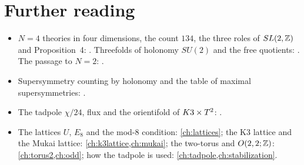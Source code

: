 \section*{Further reading}
\begin{itemize}[leftmargin=*]
 \item $N=4$ theories in four dimensions, the count $134$, the three roles of $SL(2,\mathbb{Z})$ and
 Proposition~4: . Threefolds of holonomy $SU(2)$ and the
 free quotients: . The passage to $N=2$:
 .
 \item Supersymmetry counting by holonomy and the table of maximal supersymmetries:
 .
 \item The tadpole $\chi/24$, flux and the orientifold of $K3\times T^2$:
 .
 \item The lattices $U$, $E_8$ and the mod-$8$ condition: \cref{ch:lattices}; the K3 lattice
 and the Mukai lattice: \cref{ch:k3lattice,ch:mukai}; the two-torus and $O(2,2;\mathbb{Z})$:
 \cref{ch:torus2,ch:odd}; how the tadpole is used: \cref{ch:tadpole,ch:stabilization}.
\end{itemize}
